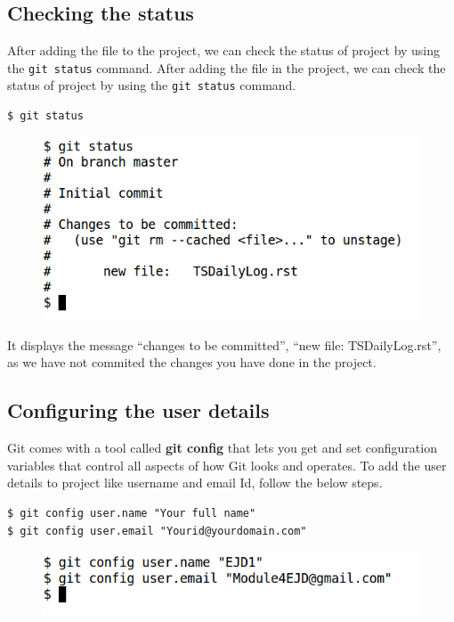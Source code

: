 \documentclass[11pt,a4paper]{article}
\begin{document}
\subsection*{Checking the status}
After adding the file to the project, we can check the status of project by using the \texttt{git status} command.
After adding the file in the project, we can check the status of project by using the \texttt{git status} command.
\begin{verbatim}
$ git status
\end{verbatim}
\begin{figure}[H]
    \begin{center}
        \includegraphics[scale=0.5]{status1.png}
   \end{center}
    \end{figure}
It displays the message ``changes to be committed'', ``new file: TSDailyLog.rst'', as we have not commited the changes you have done in the project.

\subsection*{Configuring the user details}
Git comes with a tool called \textbf{git config} that lets you get and set configuration variables that control all aspects of how Git looks and operates. To add the user details to project like username and email Id, follow the below steps.
\begin{verbatim}
$ git config user.name "Your full name"
$ git config user.email "Yourid@yourdomain.com"
\end{verbatim}
\begin{figure}[H]
    \begin{center}
        \includegraphics[scale=0.5]{localconfig1.png}
      \end{center}
    \end{figure}
\end{document}
